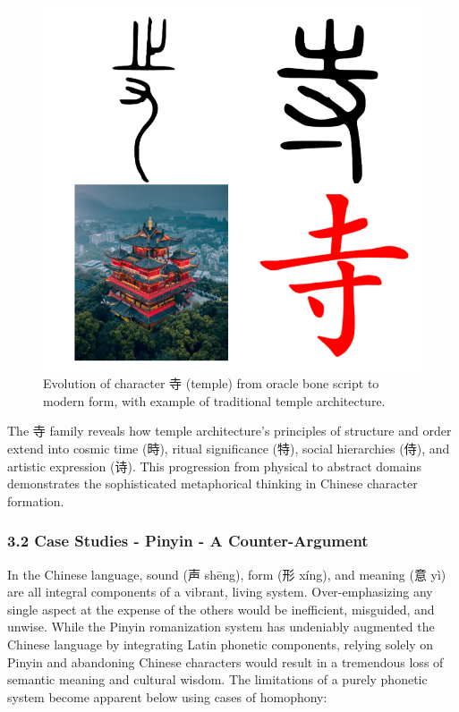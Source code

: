 \begin{figure}
\centering
\includegraphics{./images/zi_temple.png}
\caption{Evolution of character 寺 (temple) from oracle bone script to
modern form, with example of traditional temple architecture.}
\end{figure}

The 寺 family reveals how temple architecture's principles of structure
and order extend into cosmic time (時), ritual significance (特), social
hierarchies (侍), and artistic expression (诗). This progression from
physical to abstract domains demonstrates the sophisticated metaphorical
thinking in Chinese character formation.

\subsubsection{3.2 Case Studies - Pinyin - A
Counter-Argument}\label{case-studies---pinyin---a-counter-argument}

In the Chinese language, sound (声 shēng), form (形 xíng), and meaning
(意 yì) are all integral components of a vibrant, living system.
Over-emphasizing any single aspect at the expense of the others would be
inefficient, misguided, and unwise. While the Pinyin romanization system
has undeniably augmented the Chinese language by integrating Latin
phonetic components, relying solely on Pinyin and abandoning Chinese
characters would result in a tremendous loss of semantic meaning and
cultural wisdom. The limitations of a purely phonetic system become
apparent below using cases of homophony:

